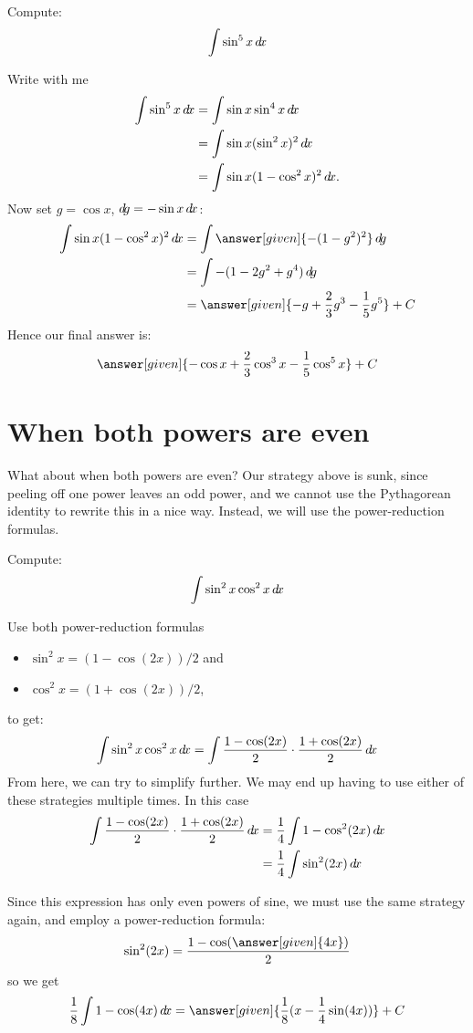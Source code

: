 \documentclass{ximera}
\begin{document}
\begin{example}
  Compute:
  \[
  \int \sin^5 x \mathop{}\!d\! x
  \]
  \begin{explanation}
    Write with me
    \begin{align*}
      \int \sin^5 x\d x &=\int \sin x \sin^4 x\d x\\
      &= \int \sin x (\sin^2 x)^2\d x\\
      &= \int \sin x (1-\cos^2 x)^2\d x.
    \end{align*}
    Now set $g=\cos x$, $\mathop{}\!d\! g=-\sin x\mathop{}\!d\! x$:
    \begin{align*}
      \int \sin x (1-\cos^2 x)^2\d x&=\int \answer[given]{-(1-g^2)^2} \d g \\
      &=\int -(1-2g^2+g^4)\d g \\
      &=\answer[given]{-g+\frac{2}{3}g^3-\frac{1}{5}g^5}+C
    \end{align*}
    Hence our final answer is:
    \[
    \answer[given]{-\cos x+\frac{2}{3}\cos^3 x-\frac{1}{5}\cos^5x}+C
    \]
  \end{explanation}
\end{example}
  
\section{When both powers are even}

What about when both powers are even?  Our strategy above is sunk,
since peeling off one power leaves an odd power, and we cannot use the
Pythagorean identity to rewrite this in a nice way.  Instead, we will
use the power-reduction formulas.

\begin{example}
  Compute:
  \[
  \int \sin^2x\cos^2x\mathop{}\!d\! x
  \]
  \begin{explanation} 
    Use both power-reduction formulas
    \begin{itemize}
    \item $\sin^2x =(1-\cos(2x))/2$ and
    \item $\cos^2x =(1+\cos(2x))/2$,
    \end{itemize}
    to get:
    \[
    \int \sin^2x\cos^2x\mathop{}\!d\! x=\int \frac{1-\cos(2x)}{2}\cdot
    \frac{1+\cos(2x)}{2}\mathop{}\!d\! x
    \]
    From here, we can try to simplify further.  We may end up having
    to use either of these strategies multiple times.  In this case
    \begin{align*}
      \int \frac{1-\cos(2x)}{2} \cdot \frac{1+\cos(2x)}{2}\mathop{}\!d\! x &= \frac{1}{4} \int 1-\cos^2(2x) \mathop{}\!d\! x\\
      &= \frac{1}{4} \int \sin^2(2x) \mathop{}\!d\! x
    \end{align*}
    
    Since this expression has only even powers of sine, we must use
    the same strategy again, and employ a power-reduction formula:
    \[
    \sin^2(2x) = \frac{1-\cos(\answer[given]{4x})}{2}
    \]
    so we get
    \[
    \frac{1}{8}\int 1-\cos(4x) \d x = \answer[given]{\frac{1}{8}(x - \frac{1}{4}\sin(4x))} + C
    \]
  \end{explanation}
\end{example}
\end{document}
